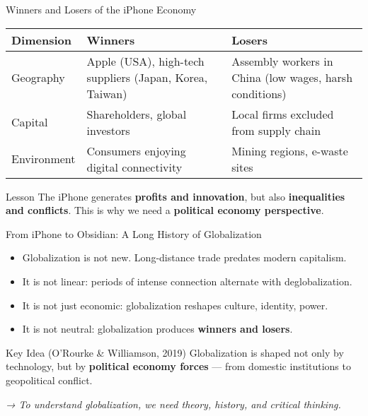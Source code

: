 \documentclass{beamer}
\begin{document}
\begin{frame}{Winners and Losers of the iPhone Economy}
\small
\begin{table}[h!]
\centering
\renewcommand{\arraystretch}{1.3}
\begin{tabular}{p{3cm} p{3.2cm} p{3.2cm}}
\toprule
\textbf{Dimension} & \textbf{Winners} & \textbf{Losers} \\
\midrule
Geography & Apple (USA), high-tech suppliers (Japan, Korea, Taiwan) & Assembly workers in China (low wages, harsh conditions) \\
\midrule
Capital & Shareholders, global investors & Local firms excluded from supply chain \\
\midrule
Environment & Consumers enjoying digital connectivity & Mining regions, e-waste sites \\
\bottomrule
\end{tabular}
\end{table}

\begin{block}{Lesson}
The iPhone generates \textbf{profits and innovation}, but also \textbf{inequalities and conflicts}.  
This is why we need a \textbf{political economy perspective}.
\end{block}
\end{frame}

\begin{frame}{From iPhone to Obsidian: A Long History of Globalization}

\small
\begin{itemize}
    \item Globalization is not new. Long-distance trade predates modern capitalism.
    \item It is not linear: periods of intense connection alternate with deglobalization.
    \item It is not just economic: globalization reshapes culture, identity, power.
    \item It is not neutral: globalization produces \textbf{winners and losers}.
\end{itemize}

\vspace{0.6em}
\begin{block}{Key Idea (O’Rourke \& Williamson, 2019)}
Globalization is shaped not only by technology, but by \textbf{political economy forces} — from domestic institutions to geopolitical conflict.
\end{block}

\vspace{0.4em}
\scriptsize
\textit{→ To understand globalization, we need theory, history, and critical thinking.}
\end{frame}
\end{document}
